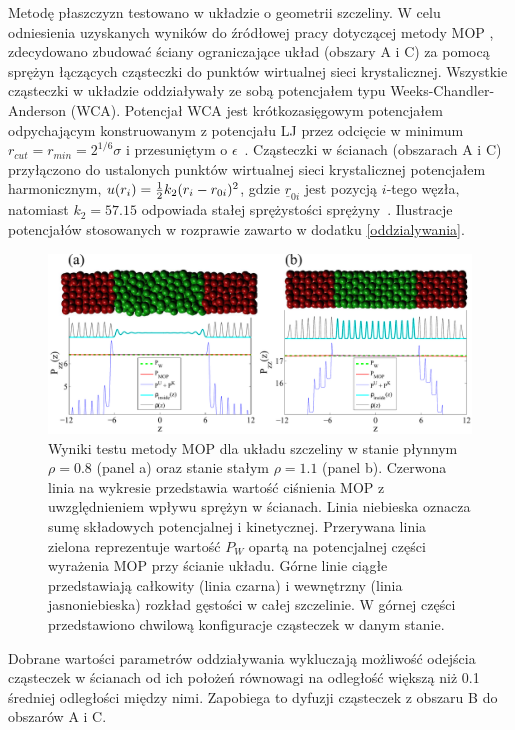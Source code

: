 \documentclass[12pt,a4paper,openright]{report} %
\begin{document}
Metodę płaszczyzn testowano w układzie o geometrii szczeliny. W celu odniesienia uzyskanych wyników do źródłowej pracy dotyczącej metody MOP \cite{Todd}, zdecydowano zbudować ściany ograniczające układ (obszary A i C) za pomocą sprężyn łączących cząsteczki do punktów wirtualnej sieci krystalicznej.
Wszystkie cząsteczki w układzie oddziaływały ze sobą potencjałem typu Weeks-Chandler-Anderson (WCA). Potencjał WCA jest krótkozasięgowym potencjałem odpychającym konstruowanym z potencjału LJ przez odcięcie w minimum $r_{cut} = r_{min} = 2^{1/6} \sigma$ i przesuniętym o $\epsilon$~\cite{AllenTildesley}.
%
Cząsteczki w ścianach (obszarach A i C) przyłączono do ustalonych punktów wirtualnej sieci krystalicznej potencjałem harmonicznym, $u(r_{i})= {1 \over 2} k_{2}(r_{i}-r_{0i})^{2}$,
gdzie $\underline{r}_{0i}$ jest pozycją $i$-tego węzła,
natomiast $k_{2}=57.15$ odpowiada stałej sprężystości sprężyny~\cite{Todd}. Ilustracje potencjałów stosowanych w rozprawie zawarto w dodatku \ref{oddzialywania}.
%
\begin{figure}[h]
\centering
\includegraphics[width=150mm]{rysunki/PZZ.pdf}
\caption{Wyniki testu metody MOP dla układu szczeliny w stanie płynnym $\rho=0.8$ (panel a) oraz stanie stałym $\rho=1.1$ (panel b). Czerwona linia na wykresie przedstawia wartość ciśnienia MOP z uwzględnieniem wpływu sprężyn w ścianach. Linia niebieska oznacza sumę składowych potencjalnej i kinetycznej. Przerywana linia zielona reprezentuje wartość $P_{W}$ opartą na potencjalnej części wyrażenia MOP przy ścianie układu. Górne linie ciągłe przedstawiają całkowity (linia czarna) i wewnętrzny (linia jasnoniebieska) rozkład gęstości w całej szczelinie. W górnej części przedstawiono chwilową konfiguracje cząsteczek w danym stanie.}
\label{PZZ}
\end{figure}
%
Dobrane wartości parametrów oddziaływania wykluczają możliwość odejścia cząsteczek w ścianach od ich położeń równowagi na odległość większą niż 0.1 średniej odległości między nimi. Zapobiega to dyfuzji cząsteczek z obszaru B do obszarów A i C.
\end{document}

